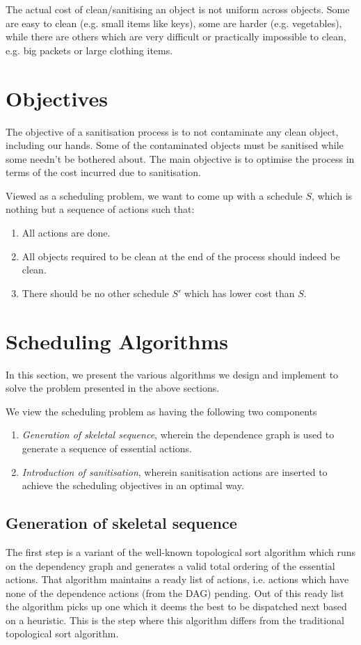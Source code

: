 \documentclass[12pts]{article}
\begin{document}
The actual cost of clean/sanitising an object is not uniform across objects. Some are easy to clean (e.g. small items like keys), some are harder (e.g. vegetables), while there are others which are very difficult or practically impossible to clean, e.g. big packets or large clothing items.

\section{Objectives}
The objective of a sanitisation process is to not contaminate any clean object, including our hands. Some of the contaminated objects must be sanitised while some needn't be bothered about. The main objective is to optimise the process in terms of the cost incurred due to sanitisation.

Viewed as a scheduling problem, we want to come up with a schedule $S$, which is nothing but a sequence of actions such that:
\begin{enumerate}
\item All actions are done.
\item All objects required to be clean at the end of the process should indeed be clean.
\item There should be no other schedule $S'$ which has lower cost than $S$.
\end{enumerate}

\section{Scheduling Algorithms}

In this section, we present the various algorithms we design and implement to solve the problem presented in the above sections.

We view the scheduling problem as having the following two components
\begin{enumerate}
\item \emph{Generation of skeletal sequence}, wherein the dependence graph is used to generate a sequence of essential actions.
\item \emph{Introduction of sanitisation}, wherein sanitisation actions are inserted to achieve the scheduling objectives in an optimal way.
\end{enumerate}

\subsection{Generation of skeletal sequence}
The first step is a variant of the well-known topological sort algorithm which runs on the dependency graph and generates a valid total ordering of the essential actions. That algorithm maintains a ready list of actions, i.e. actions which have none of the dependence actions (from the DAG) pending. Out of this ready list the algorithm picks up one which it deems the best to be dispatched next based on a heuristic. This is the step where this algorithm differs from the traditional topological sort algorithm.
\end{document}
